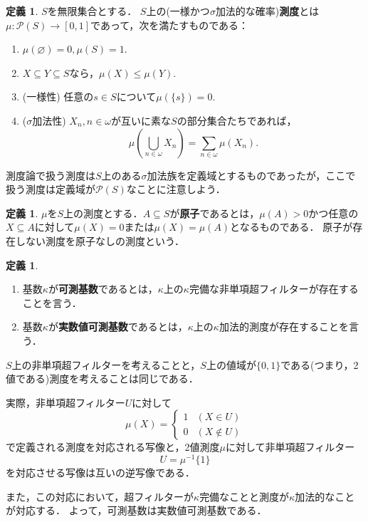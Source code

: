 \documentclass[uplatex]{jsarticle}
\newcommand{\Pow}{\mathcal{P}}
\renewcommand\emptyset{\varnothing}
\renewcommand\subset{\subseteq}
\theoremstyle{definition}
\newtheorem{defi}[thm]{定義}
\begin{document}
	\begin{defi}
		$S$を無限集合とする． $S$上の(一様かつ$\sigma$加法的な確率)\textbf{測度}とは$\mu \colon \Pow(S) \to [0, 1]$であって，次を満たすものである：
		\begin{enumerate}
			\item $\mu(\emptyset) = 0, \mu(S) = 1$.
			\item $X \subset Y \subset S$なら，$\mu(X) \le \mu(Y)$.
			\item (一様性) 任意の$s \in S$について$\mu(\{s\}) = 0$.
			\item ($\sigma$加法性) $X_n, n \in \omega$が互いに素な$S$の部分集合たちであれば，
			\[
			\mu\left(\bigcup_{n \in \omega} X_n\right) = \sum_{n \in \omega} \mu(X_n). 
			\]
		\end{enumerate}
	\end{defi}
	
	測度論で扱う測度は$S$上のある$\sigma$加法族を定義域とするものであったが，ここで扱う測度は定義域が$\Pow(S)$なことに注意しよう．
	
	\begin{defi}
		$\mu$を$S$上の測度とする．$A \subset S$が\textbf{原子}であるとは，$\mu(A) > 0$かつ任意の$X \subset A$に対して$\mu(X) = 0$または$\mu(X) = \mu(A)$となるものである．
		原子が存在しない測度を原子なしの測度という．
	\end{defi}
	
	\begin{defi}
		\begin{enumerate}
			\item 基数$\kappa$が\textbf{可測基数}であるとは，$\kappa$上の$\kappa$完備な非単項超フィルターが存在することを言う．
			\item 基数$\kappa$が\textbf{実数値可測基数}であるとは，$\kappa$上の$\kappa$加法的測度が存在することを言う．
		\end{enumerate}
	\end{defi}
	
	$S$上の非単項超フィルターを考えることと，$S$上の値域が$\{0, 1\}$である(つまり，2値である)測度を考えることは同じである．
	
	実際，非単項超フィルター$U$に対して
	\[\mu(X) = \begin{cases}1 & (X \in U)\\ 0 & (X \not \in U) \end{cases}\]
	で定義される測度を対応される写像と，2値測度$\mu$に対して非単項超フィルター
	\[U = \mu^{-1}\{1\}\]
	を対応させる写像は互いの逆写像である．
	
	また，この対応において，超フィルターが$\kappa$完備なことと測度が$\kappa$加法的なことが対応する．
	よって，可測基数は実数値可測基数である．
	
\end{document}
